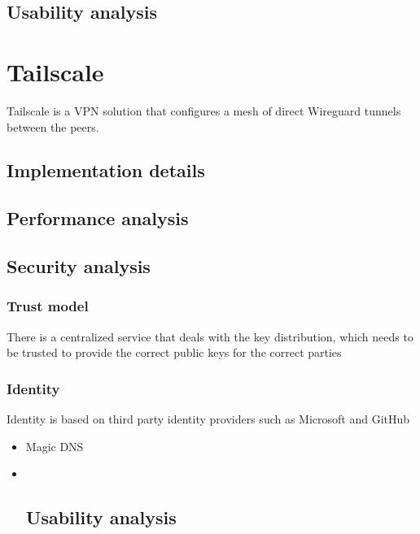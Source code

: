\hypertarget{usability-analysis}{%
\section{Usability analysis}\label{usability-analysis}}

\hypertarget{tailscale}{%
\chapter{Tailscale}\label{tailscale}}

Tailscale is a VPN solution that configures a mesh of direct Wireguard
tunnels between the peers.

\hypertarget{implementation-details}{%
\section{Implementation details}\label{implementation-details}}

\hypertarget{performance-analysis}{%
\section{Performance analysis}\label{performance-analysis}}

\hypertarget{security-analysis}{%
\section{Security analysis}\label{security-analysis}}

\hypertarget{trust-model}{%
\subsection{Trust model}\label{trust-model}}

There is a centralized service that deals with the key distribution,
which needs to be trusted to provide the correct public keys for the
correct parties

\hypertarget{identity}{%
\subsection{Identity}\label{identity}}

Identity is based on third party identity providers such as Microsoft
and GitHub

\begin{itemize}
\item
  Magic DNS
\item ~
  \hypertarget{usability-analysis}{%
  \section{Usability analysis}\label{usability-analysis}}
\end{itemize}

